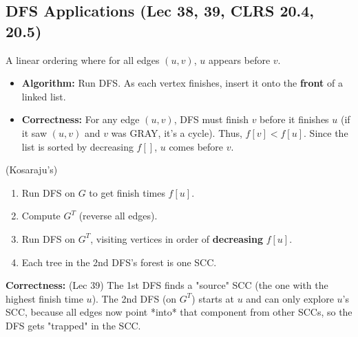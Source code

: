 \subsection{DFS Applications (Lec 38, 39, CLRS 20.4, 20.5)}
\begin{description}
    \item[Topological Sort (for DAGs)] A linear ordering where for all edges $(u, v)$, $u$ appears before $v$.
    \begin{itemize}
        \item \textbf{Algorithm:} Run DFS. As each vertex finishes, insert it onto the \textbf{front} of a linked list.
        \item \textbf{Correctness:} For any edge $(u,v)$, DFS must finish $v$ before it finishes $u$ (if it saw $(u,v)$ and $v$ was GRAY, it's a cycle). Thus, $f[v] < f[u]$. Since the list is sorted by decreasing $f[]$, $u$ comes before $v$.
    \end{itemize}
    \item[Strongly Connected Components (SCCs)] (Kosaraju's)
    \begin{enumerate}
        \item Run DFS on $G$ to get finish times $f[u]$.
        \item Compute $G^T$ (reverse all edges).
        \item Run DFS on $G^T$, visiting vertices in order of \textbf{decreasing} $f[u]$.
        \item Each tree in the 2nd DFS's forest is one SCC.
    \end{enumerate}
    \item \textbf{Correctness:} (Lec 39) The 1st DFS finds a "source" SCC (the one with the highest finish time $u$). The 2nd DFS (on $G^T$) starts at $u$ and can only explore $u$'s SCC, because all edges now point *into* that component from other SCCs, so the DFS gets "trapped" in the SCC.
\end{description}

